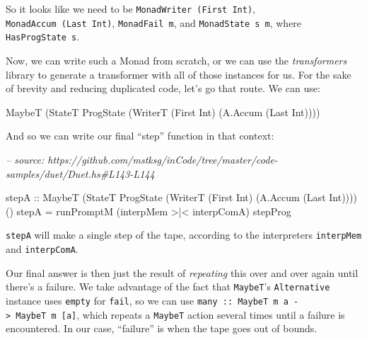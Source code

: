 \documentclass[]{article}
\newenvironment{Shaded}{}{}
\newcommand{\CommentTok}[1]{\textcolor[rgb]{0.38,0.63,0.69}{\textit{#1}}}
\newcommand{\DataTypeTok}[1]{\textcolor[rgb]{0.56,0.13,0.00}{#1}}
\newcommand{\FunctionTok}[1]{\textcolor[rgb]{0.02,0.16,0.49}{#1}}
\newcommand{\NormalTok}[1]{#1}
\newcommand{\OtherTok}[1]{\textcolor[rgb]{0.00,0.44,0.13}{#1}}
\begin{document}
So it looks like we need to be \texttt{MonadWriter\ (First\ Int)},
\texttt{MonadAccum\ (Last\ Int)}, \texttt{MonadFail\ m}, and
\texttt{MonadState\ s\ m}, where \texttt{HasProgState\ s}.

Now, we can write such a Monad from scratch, or we can use the
\emph{transformers} library to generate a transformer with all of those
instances for us. For the sake of brevity and reducing duplicated code, let's go
that route. We can use:

\begin{Shaded}
\begin{Highlighting}[]
\DataTypeTok{MaybeT}\NormalTok{ (}\DataTypeTok{StateT} \DataTypeTok{ProgState}\NormalTok{ (}\DataTypeTok{WriterT}\NormalTok{ (}\DataTypeTok{First} \DataTypeTok{Int}\NormalTok{) (}\DataTypeTok{A.Accum}\NormalTok{ (}\DataTypeTok{Last} \DataTypeTok{Int}\NormalTok{))))}
\end{Highlighting}
\end{Shaded}

And so we can write our final ``step'' function in that context:

\begin{Shaded}
\begin{Highlighting}[]
\CommentTok{-- source: https://github.com/mstksg/inCode/tree/master/code-samples/duet/Duet.hs#L143-L144}

\OtherTok{stepA ::} \DataTypeTok{MaybeT}\NormalTok{ (}\DataTypeTok{StateT} \DataTypeTok{ProgState}\NormalTok{ (}\DataTypeTok{WriterT}\NormalTok{ (}\DataTypeTok{First} \DataTypeTok{Int}\NormalTok{) (}\DataTypeTok{A.Accum}\NormalTok{ (}\DataTypeTok{Last} \DataTypeTok{Int}\NormalTok{)))) ()}
\NormalTok{stepA }\FunctionTok{=}\NormalTok{ runPromptM (interpMem }\FunctionTok{>|<}\NormalTok{ interpComA) stepProg}
\end{Highlighting}
\end{Shaded}

\texttt{stepA} will make a single step of the tape, according to the
interpreters \texttt{interpMem} and \texttt{interpComA}.

Our final answer is then just the result of \emph{repeating} this over and over
again until there's a failure. We take advantage of the fact that
\texttt{MaybeT}'s \texttt{Alternative} instance uses \texttt{empty} for
\texttt{fail}, so we can use
\texttt{many\ ::\ MaybeT\ m\ a\ -\textgreater{}\ MaybeT\ m\ {[}a{]}}, which
repeats a \texttt{MaybeT} action several times until a failure is encountered.
In our case, ``failure'' is when the tape goes out of bounds.
\end{document}
